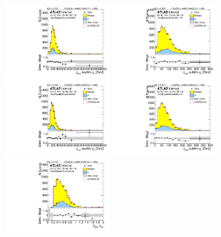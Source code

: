 \begin{figure}[htb!]
\begin{center}
\includegraphics[width=0.41\textwidth,angle=-90]{figures/boosted/Sideband/b77_ThreeTag_Sideband_leadHCand_trk0_Pt.pdf}
\includegraphics[width=0.41\textwidth,angle=-90]{figures/boosted/Sideband/b77_ThreeTag_Sideband_leadHCand_trk1_Pt.pdf}\\
\includegraphics[width=0.41\textwidth,angle=-90]{figures/boosted/Sideband/b77_ThreeTag_Sideband_sublHCand_trk0_Pt.pdf}
\includegraphics[width=0.41\textwidth,angle=-90]{figures/boosted/Sideband/b77_ThreeTag_Sideband_sublHCand_trk1_Pt.pdf}\\
\includegraphics[width=0.41\textwidth,angle=-90]{figures/boosted/Sideband/b77_ThreeTag_Sideband_leadHCand_trk_dr.pdf}

\end{center}
\end{figure}

